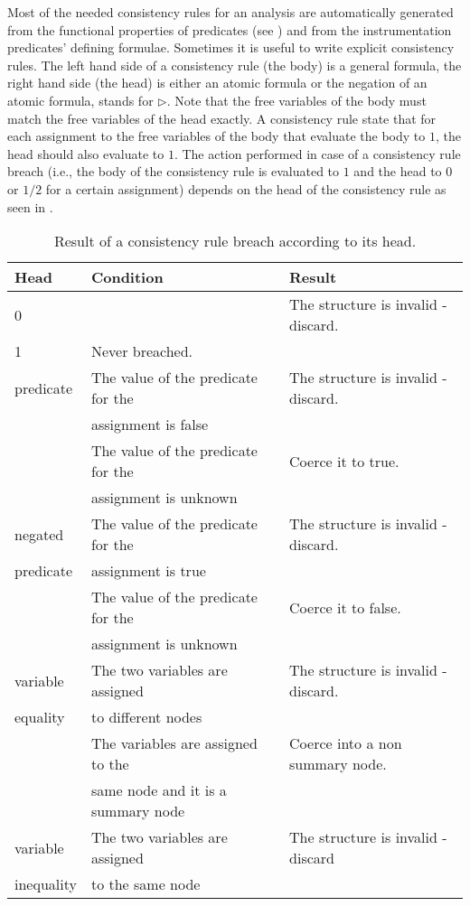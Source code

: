 Most of the needed consistency rules for an analysis are
automatically generated from the functional properties of
predicates (see ) and from the instrumentation
predicates' defining formulae.  Sometimes it is useful to write
explicit consistency rules.  The left hand side of a consistency
rule (the body) is a general formula, the right hand side (the
head) is either an atomic formula or the negation of an atomic
formula, \impliesT stands for $\triangleright$.  Note that the
free variables of the body must match the free variables of the
head exactly.  A consistency rule state that for each assignment
to the free variables of the body that evaluate the body to $1$,
the head should also evaluate to $1$.  The action performed in
case of a consistency rule breach (i.e., the body of the
consistency rule is evaluated to $1$ and the head to $0$ or $1/2$
for a certain assignment) depends on the head of the consistency
rule as seen in .
\begin{table}
\begin{center}
\begin{tabular}{|l|l|l|}
\hline \hline
\textbf{Head} & \textbf{Condition} & \textbf{Result}\\
\hline
0 & & The structure is invalid - discard.\\
\hline
1 & Never breached. & \\
\hline predicate & The value of the predicate for the &
The structure is invalid - discard.\\
          & assignment is false & \\
          & The value of the predicate for the & Coerce it to true.\\
          & assignment is unknown & \\
\hline
negated   & The value of the predicate for the & The structure is invalid - discard.\\
predicate & assignment is true & \\
          & The value of the predicate for the & Coerce it to false.\\
          & assignment is unknown & \\
\hline
variable & The two variables are assigned & The structure is invalid - discard.\\
equality         & to different nodes & \\
         & The variables are assigned to the & Coerce into a non summary node.\\
         & same node and it is a summary node & \\
\hline
variable  & The two variables are assigned & The structure is invalid - discard\\
inequality & to the same node & \\
\hline
\end{tabular}
\end{center}
\caption{\label{Ta:ConsAct}Result of a consistency rule breach
according to its head.}
\end{table}

